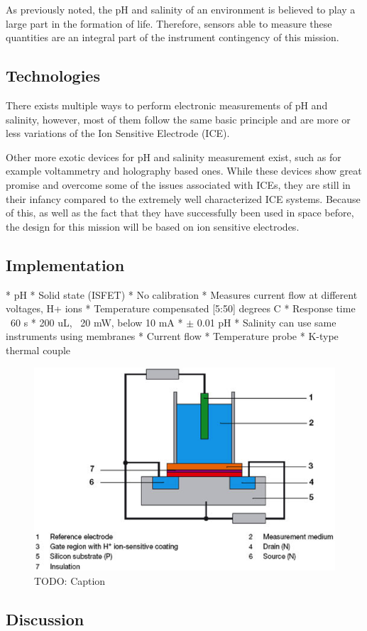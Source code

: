 As previously noted, the pH and salinity of an environment is believed to play a large part in the formation of life. Therefore, sensors able to measure these quantities are an integral part of the instrument contingency of this mission. 

\subsection{Technologies}
There exists multiple ways to perform electronic measurements of pH and salinity, however, most of them follow the same basic principle and are more or less variations of the Ion Sensitive Electrode (ICE).\\


\noindent
Other more exotic devices for pH and salinity measurement exist, such as for example voltammetry\cite{website:senova} and holography\cite{article:marshall2003a} based ones. While these devices show great promise and overcome some of the issues associated with ICEs, they are still in their infancy compared to the extremely well characterized ICE systems. Because of this, as well as the fact that they have successfully been used in space before\cite{article:jgre2487}, the design for this mission will be based on ion sensitive electrodes. 

\subsection{Implementation}
* pH
	* Solid state (ISFET)
		* No calibration
		* Measures current flow at different voltages, H+ ions
	* Temperature compensated [5:50] degrees C
		* Response time ~60 s
	* 200 uL, ~20 mW, below 10 mA
	* $\pm$ 0.01 pH
* Salinity can use same instruments using membranes
	* Current flow
* Temperature probe
	* K-type thermal couple

\begin{figure}[htb]
	\centering
	\includegraphics[width=\textwidth]{figures/ISFET.png}
	\caption{TODO: Caption}
	\label{fig:ISFET}
\end{figure}

\subsection{Discussion}
